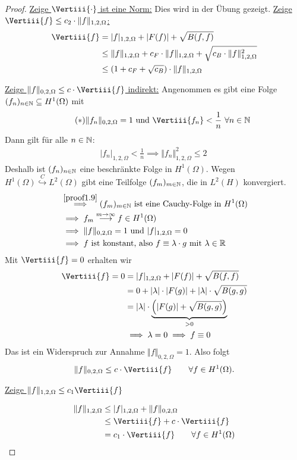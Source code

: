 \begin{proof}\enter
	\underline{Zeige $\Vertiii{\cdot}$ ist eine Norm:}
Dies wird in der Übung gezeigt.\enter \enter
\underline{Zeige $\Vertiii{f}\leq c_2\cdot\Vert f\Vert_{1,2,\Omega}$:}
\begin{align*}
\Vertiii{f} &=
|f|_{1,2,\Omega}+|F(f)|+\sqrt{B(f,f)}\\
&\leq
\Vert f\Vert_{1,2,\Omega} +c_F\cdot\Vert f\Vert_{1,2,\Omega}+\sqrt{c_B\cdot\Vert f\Vert^2_{1,2,\Omega}}\\
&\leq
(1+c_F+\sqrt{c_B})\cdot\Vert f\Vert_{1,2,\Omega}
\end{align*}

\underline{Zeige $\Vert f\Vert_{0,2,\Omega}\leq c\cdot\Vertiii{f}$ indirekt:}
Angenommen es gibt eine Folge $(f_n)_{n\in\mathbb{N}}\subseteq H^1(\Omega)$ mit
\begin{align}\label{proof1.9}\tag{$\ast$}
\Vert f_n\Vert_{0,2,\Omega}=1\text{ und }\Vertiii{f_n}<\frac{1}{n}~\forall n\in\N
\end{align}
Dann gilt für alle $n\in\mathbb{N}$:
\begin{align*}
|f_n|_{1,2,\Omega}<\frac{1}{n}
\implies
\Vert f_n\Vert^2_{1,2,\Omega}\leq 2\
\end{align*}
Deshalb ist $(f_n)_{n\in\mathbb{N}}$ eine beschränkte Folge in $H^1(\Omega)$. Wegen $H^1(\Omega)\stackrel{C}{\hookrightarrow} L^2(\Omega)$ gibt eine Teilfolge $(f_m)_{m\in\mathbb{N}}$, die in $L^2(H)$ konvergiert.
\begin{align*}
&\stackrel{\eqref{proof1.9}}{\implies}
(f_m)_{m\in\mathbb{N}}\text{ ist eine Cauchy-Folge in }H^1(\Omega)\\
&\implies
 f_m\stackrel{m\to\infty}{\longrightarrow} f\in H^1(\Omega)\\
 &\implies
 \Vert f\Vert_{0,2,\Omega}=1\text{ und } |f|_{1,2,\Omega}=0\\
 &\implies
 f\text{ ist konstant, also } f\equiv \lambda\cdot g\text{ mit }\lambda\in\mathbb{R}
\end{align*}
Mit $\Vertiii{f}=0$ erhalten wir
\begin{align*}
\Vertiii{f} = 0 
&=|f|_{1,2,\Omega}+|F(f)|+\sqrt{B(f,f)}\\
&=0+|\lambda|\cdot|F(g)|+|\lambda|\cdot\sqrt{B(g,g)}\\
&=|\lambda|\cdot\underbrace{\Big(|F(g)|+\sqrt{B(g,g)}\Big)}_{>0}\\
&\implies\lambda=0\implies f\equiv 0
\end{align*}
Das ist ein Widerspruch zur Annahme $\Vert f\Vert_{0,2,\Omega}=1$. Also folgt
\begin{align*}
\Vert f\Vert_{0,2,\Omega}\leq c\cdot\Vertiii{f}\qquad\forall f\in H^1(\Omega).
\end{align*}

\underline{Zeige $\|f\|_{1,2,\Omega}\leq c_1 \Vertiii{f}$}

\begin{align*}
\Vert f\Vert_{1,2,\Omega}
&\leq
|f|_{1,2,\Omega}+\Vert f\Vert_{0,2,\Omega}\\
&\leq
\Vertiii{f}+c\cdot\Vertiii{f}\\
&=c_1\cdot\Vertiii{f}\qquad\forall f\in H^1(\Omega)
\end{align*}
\end{proof}


